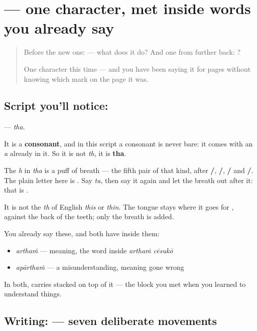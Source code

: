 \section[\texorpdfstring{\te{థ} (tha)}{థ (tha)}]{ — one character, met inside words you already say}

\label{lesson:TE-S130-letter-tha}



\begin{quote}
Before the new one:  — what does it do? And one from further back: ?

One character this time — and you have been saying it for pages without knowing which mark on the page it was.
\end{quote}

\subsection*{Script you'll notice: }
\textbf{} — \emph{tha}.

It is a \textbf{consonant}, and in this script a consonant is never bare: it comes with an \emph{a} already in it. So it is not \emph{th}, it is \textbf{tha}.

The \emph{h} in \emph{tha} is a puff of breath — the fifth pair of that kind, after \textbf{/}, \textbf{/}, \textbf{/} and \textbf{/}. The plain letter here is \textbf{}. Say \emph{ta}, then say it again and let the breath out after it: that is \textbf{}.

It is not the \emph{th} of English \emph{this} or \emph{thin}. The tongue stays where it goes for \textbf{}, against the back of the teeth; only the breath is added.

You already say these, and both have  inside them:

\begin{itemize}
\raggedright
  \item \textbf{} \emph{arthaṁ} — meaning, the word inside \emph{arthaṁ cēsukō}
  \item \textbf{} \emph{apārthaṁ} — a misunderstanding, meaning gone wrong
\end{itemize}

In both,  carries \textbf{} stacked on top of it — the \textbf{} block you met when you learned to understand things.

\subsection*{Writing:  — seven deliberate movements}

